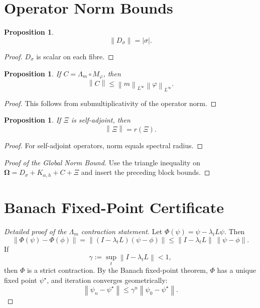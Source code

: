 \documentclass[11pt]{article}
\theoremstyle{plain}
\newtheorem{proposition}[theorem]{Proposition}
\theoremstyle{definition}
\theoremstyle{remark}
\newcommand{\Om}{\boldsymbol{\Omega}}
\newcommand{\norm}[1]{\left\lVert #1 \right\rVert}
\begin{document}
\section{Operator Norm Bounds}

\begin{proposition}
\[
\norm{D_\sigma}=|\sigma|.
\]
\end{proposition}

\begin{proof}
\(D_\sigma\) is scalar on each fibre.
\end{proof}

\begin{proposition}
If \(C=\Lambda_m\circ M_\varphi\), then
\[
\norm{C}\le \norm{m}_{L^\infty}\norm{\varphi}_{L^\infty}.
\]
\end{proposition}

\begin{proof}
This follows from submultiplicativity of the operator norm.
\end{proof}

\begin{proposition}
If \(\Xi\) is self-adjoint, then
\[
\norm{\Xi}=r(\Xi).
\]
\end{proposition}

\begin{proof}
For self-adjoint operators, norm equals spectral radius.
\end{proof}

\begin{proof}[Proof of the Global Norm Bound]
Use the triangle inequality on \(\Om = D_\sigma + K_{\alpha,h} + C + \Xi\) and insert the preceding block bounds.
\end{proof}

\section{Banach Fixed-Point Certificate}

\begin{proof}[Detailed proof of the \(\Lambda_m\) contraction statement]
Let \(\Phi(\psi)=\psi-\lambda_t L\psi\). Then
\[
\norm{\Phi(\psi)-\Phi(\phi)}
=
\norm{(I-\lambda_t L)(\psi-\phi)}
\le
\norm{I-\lambda_t L}\,\norm{\psi-\phi}.
\]
If
\[
\gamma := \sup_t \norm{I-\lambda_t L} < 1,
\]
then \(\Phi\) is a strict contraction. By the Banach fixed-point theorem, \(\Phi\) has a unique fixed point \(\psi^\star\), and iteration converges geometrically:
\[
\norm{\psi_n-\psi^\star}\le \gamma^n \norm{\psi_0-\psi^\star}.
\]
\end{proof}
\end{document}
